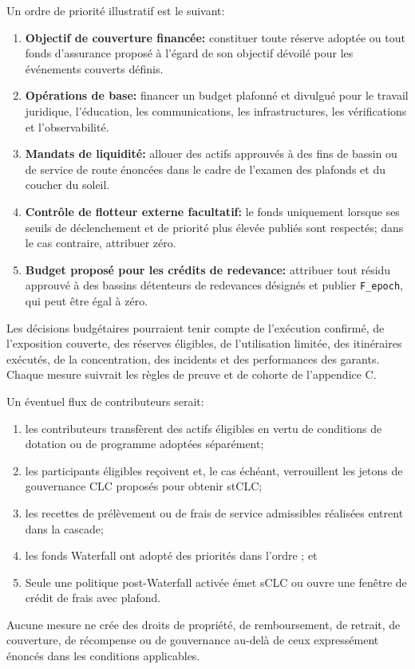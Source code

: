 \documentclass[11pt]{article}
\begin{document}
Un ordre de priorité illustratif est le suivant:

\begin{enumerate}[leftmargin=*]
\item \textbf{Objectif de couverture financée:} constituer toute réserve adoptée ou tout fonds d'assurance proposé à l'égard de son objectif dévoilé pour les événements couverts définis.
\item \textbf{Opérations de base:} financer un budget plafonné et divulgué pour le travail juridique, l'éducation, les communications, les infrastructures, les vérifications et l'observabilité.
\item \textbf{Mandats de liquidité:} allouer des actifs approuvés à des fins de bassin ou de service de route énoncées dans le cadre de l'examen des plafonds et du coucher du soleil.
\item \textbf{Contrôle de flotteur externe facultatif:} le fonds uniquement lorsque ses seuils de déclenchement et de priorité plus élevée publiés sont respectés; dans le cas contraire, attribuer zéro.
\item \textbf{Budget proposé pour les crédits de redevance:} attribuer tout résidu approuvé à des bassins détenteurs de redevances désignés et publier \texttt{F\_epoch}, qui peut être égal à zéro.
\end{enumerate}
Les décisions budgétaires pourraient tenir compte de l'exécution confirmé, de l'exposition couverte, des réserves éligibles, de l'utilisation limitée, des itinéraires exécutés, de la concentration, des incidents et des performances des garants. Chaque mesure suivrait les règles de preuve et de cohorte de l'appendice C.

Un éventuel flux de contributeurs serait:

\begin{enumerate}[leftmargin=*]
\item les contributeurs transfèrent des actifs éligibles en vertu de conditions de dotation ou de programme adoptées séparément;
\item les participants éligibles reçoivent et, le cas échéant, verrouillent les jetons de gouvernance CLC proposés pour obtenir stCLC;
\item les recettes de prélèvement ou de frais de service admissibles réalisées entrent dans la cascade;
\item les fonds Waterfall ont adopté des priorités dans l'ordre ; et
\item Seule une politique post-Waterfall activée émet sCLC ou ouvre une fenêtre de crédit de frais avec plafond.
\end{enumerate}
Aucune mesure ne crée des droits de propriété, de remboursement, de retrait, de couverture, de récompense ou de gouvernance au-delà de ceux expressément énoncés dans les conditions applicables.
\end{document}
